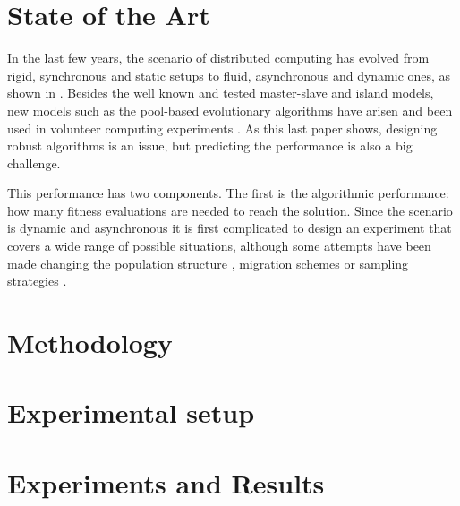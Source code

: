 \documentclass[runningheads,a4paper]{llncs}
\begin{document}

\section{State of the Art}
\label{sec:sota}

In the last few years, the scenario of distributed computing has
evolved from rigid, synchronous and static setups to fluid, asynchronous and dynamic ones, as
shown in \cite{gong2015distributed}. Besides the well known and tested
master-slave and island models, new models such as the pool-based
evolutionary algorithms
\cite{roy2009distributed,bollini1999distributed,sofea:evopar2012,sofea:naco}
have arisen and been used in volunteer computing experiments
\cite{daniel:euromicro09,DBLP:journals/corr/abs-0801-1210,DBLP:journals/gpem/LaredoBGVAGF14}. As
this last paper shows, designing robust algorithms is an issue, but
predicting the performance is also a big challenge.

This performance has two components. The first is the algorithmic
performance: how many fitness evaluations are needed to reach the
solution. Since the scenario is dynamic and asynchronous it is first
complicated to design an experiment that covers a wide range of
possible situations, although some attempts have been made changing
the population structure ,
migration schemes \cite{hijaze2014investigating} or sampling
strategies \cite{nogueras2015self}. 


\section{Methodology} %
\label{sec:met}


\section{Experimental setup}
\label{sec:exp}



\section{Experiments and Results}
\label{sec:res}
\end{document}

